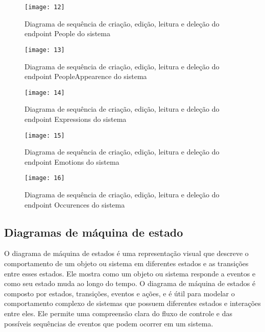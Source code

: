 \begin{figure}[h]
  \caption{Diagrama de sequência de criação, edição, leitura e deleção do endpoint People do sistema}
  \centering
  \texttt{[image: 12]}
  \label{fig:12}
\end{figure}
\FloatBarrier

\begin{figure}[h]
  \caption{Diagrama de sequência de criação, edição, leitura e deleção do endpoint PeopleAppearence do sistema}
  \centering
  \texttt{[image: 13]}
  \label{fig:13}
\end{figure}
\FloatBarrier

\begin{figure}[h]
  \caption{Diagrama de sequência de criação, edição, leitura e deleção do endpoint Expressions do sistema}
  \centering
  \texttt{[image: 14]}
  \label{fig:14}
\end{figure}
\FloatBarrier

\begin{figure}[h]
  \caption{Diagrama de sequência de criação, edição, leitura e deleção do endpoint Emotions do sistema}
  \centering
  \texttt{[image: 15]}
  \label{fig:15}
\end{figure}
\FloatBarrier

\begin{figure}[h]
  \caption{Diagrama de sequência de criação, edição, leitura e deleção do endpoint Occurences do sistema}
  \centering
  \texttt{[image: 16]}
  \label{fig:16}
\end{figure}
\FloatBarrier

\subsection{Diagramas de máquina de estado}

O diagrama de máquina de estados \cite{30} é uma representação visual que descreve o comportamento de um objeto ou sistema em diferentes estados e as transições entre esses estados. Ele mostra como um objeto ou sistema responde a eventos e como seu estado muda ao longo do tempo. O diagrama de máquina de estados é composto por estados, transições, eventos e ações, e é útil para modelar o comportamento complexo de sistemas que possuem diferentes estados e interações entre eles. Ele permite uma compreensão clara do fluxo de controle e das possíveis sequências de eventos que podem ocorrer em um sistema.

